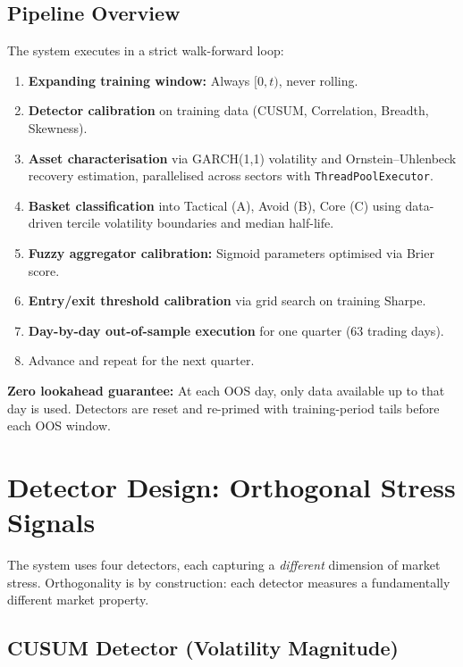 \documentclass[11pt,a4paper]{article}
\begin{document}
\subsection{Pipeline Overview}

The system executes in a strict walk-forward loop:

\begin{enumerate}[nosep]
  \item \textbf{Expanding training window:} Always $[0, t)$, never rolling.
  \item \textbf{Detector calibration} on training data (CUSUM, Correlation, Breadth, Skewness).
  \item \textbf{Asset characterisation} via GARCH(1,1) volatility and Ornstein--Uhlenbeck recovery estimation, parallelised across sectors with \texttt{ThreadPoolExecutor}.
  \item \textbf{Basket classification} into Tactical (A), Avoid (B), Core (C) using data-driven tercile volatility boundaries and median half-life.
  \item \textbf{Fuzzy aggregator calibration:} Sigmoid parameters optimised via Brier score.
  \item \textbf{Entry/exit threshold calibration} via grid search on training Sharpe.
  \item \textbf{Day-by-day out-of-sample execution} for one quarter (63 trading days).
  \item Advance and repeat for the next quarter.
\end{enumerate}

\textbf{Zero lookahead guarantee:} At each OOS day, only data available up to that day is used. Detectors are reset and re-primed with training-period tails before each OOS window.

\section{Detector Design: Orthogonal Stress Signals}
\label{sec:detectors}

The system uses four detectors, each capturing a \emph{different} dimension of market stress. Orthogonality is by construction: each detector measures a fundamentally different market property.

\subsection{CUSUM Detector (Volatility Magnitude)}
\end{document}
